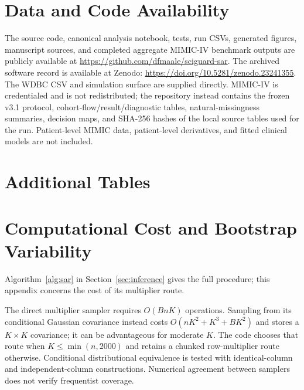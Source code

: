 \documentclass[twoside,11pt]{article}
\begin{document}
\section*{Data and Code Availability}
The source code, canonical analysis notebook, tests, run CSVs, generated figures,
manuscript sources, and completed aggregate MIMIC-IV benchmark outputs are publicly available
at \url{https://github.com/dfmaale/sciguard-sar}. The archived software record is available at
Zenodo: \url{https://doi.org/10.5281/zenodo.23241355}. The WDBC CSV and simulation surface are
supplied directly. MIMIC-IV is credentialed and is not redistributed; the repository instead
contains the frozen v3.1 protocol, cohort-flow/result/diagnostic tables, natural-missingness
summaries, decision maps, and SHA-256 hashes of the local source tables used for the run.
Patient-level MIMIC data, patient-level derivatives, and fitted clinical models are not included.

\appendix
\section{Additional Tables}
\begin{table}[ht]
\centering\small
\caption{Paired mean ARR gain of multiplier over each comparator. MCSE uses paired
replication differences. These efficiency comparisons must be read with coverage results.}
\label{tab:gains}
\end{table}
\begin{table}[ht]
\centering\small
\caption{Equally spaced WDBC logistic-regression grid ablation.}
\label{tab:grid}
\end{table}
\FloatBarrier

\section{Computational Cost and Bootstrap Variability}
\label{app:runtime}
Algorithm~\ref{alg:sar} in Section~\ref{sec:inference} gives the full procedure; this appendix
concerns the cost of its multiplier route.

The direct multiplier sampler requires $O(BnK)$ operations. Sampling from its conditional
Gaussian covariance instead costs $O(nK^2+K^3+BK^2)$ and stores a $K\times K$ covariance;
it can be advantageous for moderate $K$. The code chooses that route when $K\leq\min(n,2000)$
and retains a chunked row-multiplier route otherwise. Conditional distributional equivalence
is tested with identical-column and independent-column constructions. Numerical agreement
between samplers does not verify frequentist coverage.
\end{document}
